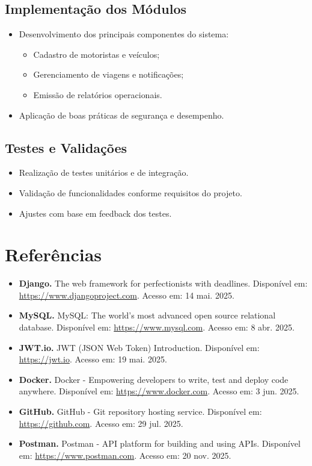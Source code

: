 \documentclass[12pt]{article}
\begin{document}
\subsection{Implementação dos Módulos}
\begin{itemize}
    \item Desenvolvimento dos principais componentes do sistema:
    \begin{itemize}
        \item Cadastro de motoristas e veículos;
        \item Gerenciamento de viagens e notificações;
        \item Emissão de relatórios operacionais.
    \end{itemize}
    \item Aplicação de boas práticas de segurança e desempenho.
\end{itemize}

\subsection{Testes e Validações}
\begin{itemize}
    \item Realização de testes unitários e de integração.
    \item Validação de funcionalidades conforme requisitos do projeto.
    \item Ajustes com base em feedback dos testes.
\end{itemize}

\newpage

\section*{Referências}
\begin{itemize}
\item \textbf{Django.} The web framework for perfectionists with deadlines. Disponível em: \url{https://www.djangoproject.com}. Acesso em: 14 mai. 2025.
\item \textbf{MySQL.} MySQL: The world's most advanced open source relational database. Disponível em: \url{https://www.mysql.com}. Acesso em: 8 abr. 2025.
\item \textbf{JWT.io.} JWT (JSON Web Token) Introduction. Disponível em: \url{https://jwt.io}. Acesso em: 19 mai. 2025.
\item \textbf{Docker.} Docker - Empowering developers to write, test and deploy code anywhere. Disponível em: \url{https://www.docker.com}. Acesso em: 3 jun. 2025.
\item \textbf{GitHub.} GitHub - Git repository hosting service. Disponível em: \url{https://github.com}. Acesso em: 29 jul. 2025.
\item \textbf{Postman.} Postman - API platform for building and using APIs. Disponível em: \url{https://www.postman.com}. Acesso em: 20 nov. 2025.
\end{itemize}
\end{document}
